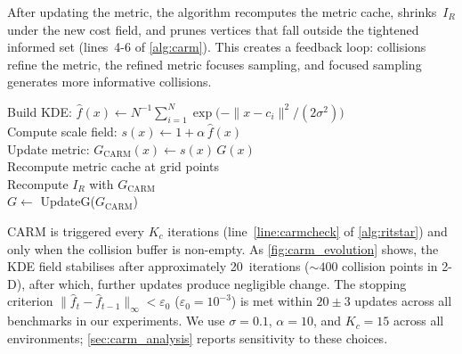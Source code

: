 \documentclass[journal]{IEEEtran}
\newcommand{\IR}{I_{\!R}}
\begin{document}
After updating the metric, the algorithm recomputes the metric
cache, shrinks~$\IR$ under the new cost field, and prunes
vertices that fall outside the tightened informed set
(lines~4-6 of \cref{alg:carm}). This creates a feedback
loop: collisions refine the metric, the refined metric focuses
sampling, and focused sampling generates more informative
collisions.

\begin{algorithm}[t]
\scriptsize
\SetAlgoLined
{}
Build KDE: $\hat{f}(x) \gets N^{-1}\sum_{i=1}^{N} \exp\!\bigl(-\|x - c_i\|^2 / (2\sigma^2)\bigr)$\\
Compute scale field: $s(x) \gets 1 + \alpha\, \hat{f}(x)$\\
Update metric: $G_{\mathrm{CARM}}(x) \gets s(x)\, G(x)$\\
Recompute metric cache at grid points\\
Recompute $\IR$ with $G_{\mathrm{CARM}}$\\
$G \gets$ UpdateG($G_\mathrm{CARM}$)\\
\caption{\textsc{CARM\_Update}($\mathcal{C}_{\mathrm{col}}, G, \sigma, \alpha$)}
\label{alg:carm}
\end{algorithm}

CARM is triggered every $K_c$ iterations
(line~\ref{line:carmcheck} of \cref{alg:ritstar}) and only when the collision
buffer is non-empty. As \cref{fig:carm_evolution} shows, the
KDE field stabilises after approximately 20~iterations
(${\sim}400$ collision points in 2-D), after which, further
updates produce negligible change. The stopping criterion $\|\hat{f}_t-\hat{f}_{t-1}\|_\infty<\varepsilon_0$ ($\varepsilon_0=10^{-3}$) is met within $20\pm3$ updates across all benchmarks in our experiments.
We use $\sigma = 0.1$, $\alpha = 10$, and $K_c = 15$ across all environments;
\cref{sec:carm_analysis} reports sensitivity to these choices.
\end{document}
